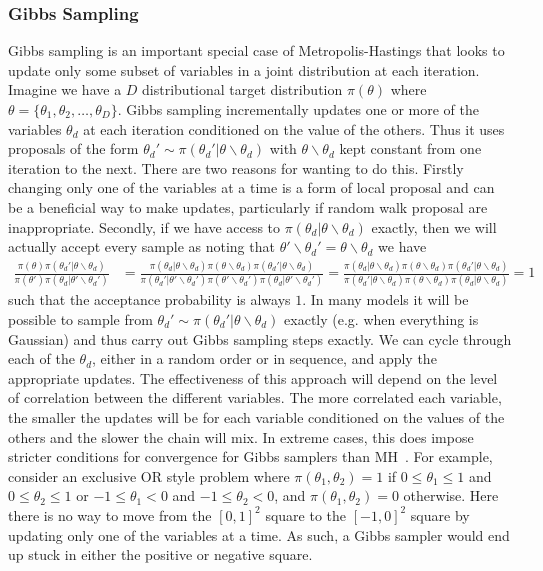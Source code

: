 \subsubsection{Gibbs Sampling}
\label{sec:inf:foundation:gibbs}

Gibbs sampling is an important special case of Metropolis-Hastings that looks to update only some
subset of variables in a joint distribution at each iteration.  Imagine we have a $D$ distributional target distribution
$\pi(\theta)$ where $\theta = \{\theta_1,\theta_2,\dots,\theta_D\}$.  Gibbs sampling incrementally
updates one or more of the variables $\theta_d$ at each iteration conditioned on the value of the others.
Thus it uses proposals of the form $\theta_d' \sim \pi(\theta_d' | \theta \backslash \theta_d)$ with
$ \theta \backslash \theta_d$ kept constant from one iteration to the next.  There are two reasons
for wanting to do this.  Firstly changing only one of the variables at a time is a form of local proposal and
can be a beneficial way to make updates, particularly if random walk proposal are inappropriate.  
Secondly, if we have access to $\pi(\theta_d | \theta \backslash \theta_d)$
exactly, then we will actually accept every sample as noting that $\theta' \backslash \theta_d' = \theta \backslash \theta_d$ we
have
\begin{align*}
\frac{\pi(\theta)\pi(\theta_d' | \theta \backslash \theta_d)}{\pi(\theta')\pi(\theta_d | \theta' \backslash \theta_d')}
&=\frac{\pi(\theta_d |  \theta \backslash \theta_d) \pi( \theta \backslash \theta_d)
	\pi(\theta_d' | \theta \backslash \theta_d)}
{\pi(\theta_d' |  \theta' \backslash \theta_d') \pi( \theta' \backslash \theta_d')\pi(\theta_d | \theta' \backslash \theta_d')} 
=\frac{\pi(\theta_d |  \theta \backslash \theta_d) \pi( \theta \backslash \theta_d)
	\pi(\theta_d' | \theta \backslash \theta_d)}
{\pi(\theta_d' |  \theta \backslash \theta_d) \pi( \theta \backslash \theta_d)\pi(\theta_d | \theta \backslash \theta_d)} 
= 1
\end{align*}
such that the acceptance probability is always $1$.
In many models it will be possible to sample from $\theta_d' \sim \pi(\theta_d' | \theta \backslash \theta_d)$
exactly (e.g. when everything is Gaussian) and thus carry out Gibbs sampling steps exactly.  We can cycle through each of
the $\theta_d$, either in a random order or in sequence, and apply the appropriate updates.  The
effectiveness of this approach will depend on the level of correlation between the different variables.  The more
correlated each variable, the smaller the updates will be for each variable conditioned on the values of the
others and the slower the chain will mix.  In extreme cases, this does impose stricter conditions
for convergence for Gibbs samplers than MH~\citep{roberts1994simple}.  For example, consider an exclusive
OR style problem where $\pi(\theta_1,\theta_2) = 1$ if $0\le\theta_1\le1$ and $0\le\theta_2\le1$
or $-1\le\theta_1<0$ and $-1\le\theta_2<0$, and $\pi(\theta_1,\theta_2) = 0$ otherwise.  Here there is no
way to move from the $[0,1]^2$ square to the $[-1,0]^2$ square by updating only one of the variables at a time.  As
such, a Gibbs sampler would end up stuck in either the positive or negative square.

